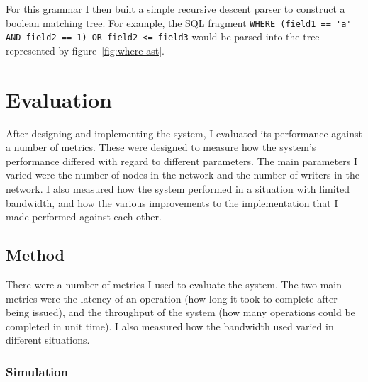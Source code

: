 \documentclass[12pt,twoside,notitlepage]{report}
\begin{document}
For this grammar I then built a simple recursive descent parser to construct a boolean matching
tree. For example, the SQL fragment \verb+WHERE (field1 == 'a' AND field2 == 1) OR field2 <= field3+
would be parsed into the tree represented by figure~\ref{fig:where-ast}.

%
%
%

%
%
%

\cleardoublepage
\chapter{Evaluation}

After designing and implementing the system, I evaluated its performance against a number of
metrics. These were designed to measure how the system's performance differed with regard to
different parameters. The main parameters I varied were the number of nodes in the network and the
number of writers in the network. I also measured how the system performed in a situation with
limited bandwidth, and how the various improvements to the implementation that I made performed
against each other.

\section{Method}

There were a number of metrics I used to evaluate the system. The two main metrics were the
latency of an operation (how long it took to complete after being issued), and the throughput of
the system (how many operations could be completed in unit time). I also measured how the
bandwidth used varied in different situations.

\subsection{Simulation}
\end{document}
